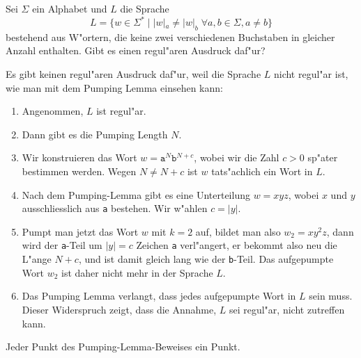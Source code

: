 Sei $\Sigma$ ein Alphabet und $L$ die Sprache
\[
L=\{ w\in\Sigma^* \;|\; |w|_a \ne |w|_b\;\forall a,b\in\Sigma, a\ne b\}
\]
bestehend aus W"ortern, die keine zwei verschiedenen Buchstaben in gleicher
Anzahl enthalten.
Gibt es einen regul"aren Ausdruck daf"ur?

\begin{loesung}
Es gibt keinen regul"aren Ausdruck daf"ur, weil die Sprache $L$ nicht regul"ar
ist, wie man mit dem Pumping Lemma einsehen kann:
\begin{enumerate}
\item Angenommen, $L$ ist regul"ar.
\item Dann gibt es die Pumping Length $N$.
\item Wir konstruieren das Wort $w=\texttt{a}^N\texttt{b}^{N+c}$, wobei
wir die Zahl $c>0$ sp"ater bestimmen werden.
Wegen $N\ne N+c$ ist $w$ tats"achlich ein Wort in $L$.
\item Nach dem Pumping-Lemma gibt es eine Unterteilung $w=xyz$, wobei
$x$ und $y$ ausschliesslich aus \texttt{a} bestehen.
Wir w"ahlen $c=|y|$.
\item Pumpt man jetzt das Wort $w$ mit $k=2$ auf, bildet man also
$w_2=xy^2z$, dann wird der \texttt{a}-Teil um $|y|=c$ Zeichen \texttt{a}
verl"angert, er bekommt also neu die L"ange $N+c$, und ist damit gleich
lang wie der \texttt{b}-Teil.
Das aufgepumpte Wort $w_2$ ist daher nicht mehr in der Sprache $L$.
\item Das Pumping Lemma verlangt, dass jedes aufgepumpte Wort in $L$
sein muss.
Dieser Widerspruch zeigt, dass die Annahme, $L$ sei regul"ar, nicht
zutreffen kann.
\qedhere
\end{enumerate}
\end{loesung}

\begin{bewertung}
Jeder Punkt des Pumping-Lemma-Beweises ein Punkt.
\end{bewertung}


